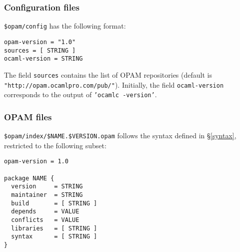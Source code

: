 \documentclass[a4paper,11pt]{article}
\begin{document}
\subsubsection{Configuration files}
\label{config}

\verb+$opam/config+ has the following format:

\begin{verbatim}
opam-version = "1.0"
sources = [ STRING ]
ocaml-version = STRING
\end{verbatim}

The field {\tt sources} contains the list of OPAM repositories
(default is {\tt "http://opam.ocamlpro.com/pub/"}). Initially, the
field {\tt ocaml-version} corresponds to the output of {\tt 'ocamlc
  -version'}.

\subsubsection{OPAM files}
\label{opam}

\verb+$opam/index/$NAME.$VERSION.opam+ follows the syntax defined in
\S\ref{syntax}, restricted to the following subset:

\begin{verbatim}
opam-version = 1.0

package NAME {
  version     = STRING
  maintainer  = STRING
  build       = [ STRING ]
  depends     = VALUE
  conflicts   = VALUE
  libraries   = [ STRING ]
  syntax      = [ STRING ]
}
\end{verbatim}
\end{document}
